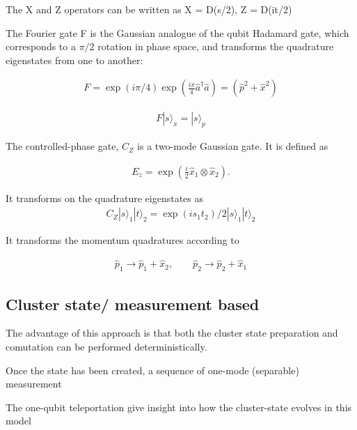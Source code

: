 \documentclass[reprint,
superscriptaddress,
 amsmath,amssymb,
 aps,
prb,
]{revtex4-1}
\newcommand{\ket}[1]{|{#1}\rangle}
\begin{document}
The X and Z operators can be written as 
X = D(s/2), Z = D(it/2)



The Fourier gate F is the Gaussian analogue of the qubit Hadamard gate, which corresponds to a $\pi/2$ rotation in phase space, and transforms the quadrature eigenstates from one to another:

\begin{eqnarray}
F = \exp(i\pi/4)\exp(\frac{i\pi}{4} \hat a^\dagger \hat a) = (\hat p^2+\hat x^2)
\end{eqnarray}

\begin{eqnarray}
F\ket{s}_x = \ket{s}_p
\end{eqnarray}


The controlled-phase gate, $C_Z$ is a two-mode Gaussian gate. It is defined as

\begin{eqnarray}
E_z = \exp\left(\frac{i}{2} \hat x_1 \otimes \hat x_2 \right).
\end{eqnarray}

It transforms on the quadrature eigenstates as
\begin{eqnarray}
C_Z \ket{s}_1 \ket{t}_2 = \exp(i s_1 t_2)/2 \ket{s}_1\ket{t}_2  
\end{eqnarray}


It transforms the momentum quadratures according to

\begin{eqnarray}
\hat p_1 \rightarrow \hat p_1 + \hat x_2, \qquad \hat p_2 \rightarrow \hat p_2 + \hat x_1
\end{eqnarray}

\subsection{Cluster state/ measurement based}



\cite{PhysRevLett.97.110501}
The advantage of this approach is that both the cluster state preparation and comutation can be performed deterministically.

Once the state has been created, a sequence of one-mode (separable) measurement 


The one-qubit teleportation give insight into how the cluster-state evolves in this model
\end{document}
